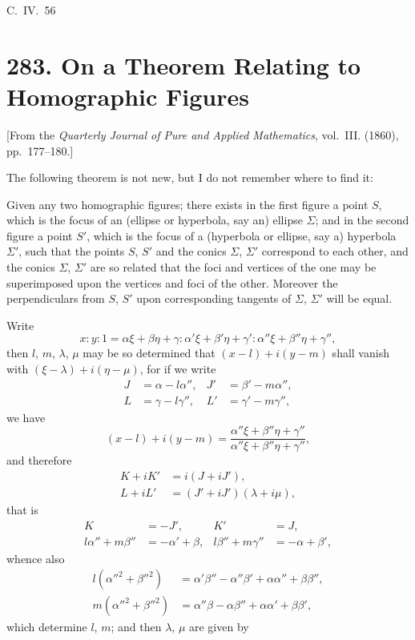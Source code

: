 \documentclass[11pt,a4paper]{article}
\theoremstyle{plain}
\begin{document}
\hfill C.~IV.\ 56



\newpage
\section*{283. On a Theorem Relating to Homographic Figures}
\label{sec:283}

[From the \textit{Quarterly Journal of Pure and Applied Mathematics}, vol.~III. (1860), pp.~177--180.]

The following theorem is not new, but I do not remember where to find it:

Given any two homographic figures; there exists in the first figure a point $S$, which is the focus of an (ellipse or hyperbola, say an) ellipse $\Sigma$; and in the second figure a point $S'$, which is the focus of a (hyperbola or ellipse, say a) hyperbola $\Sigma'$, such that the points $S$, $S'$ and the conics $\Sigma$, $\Sigma'$ correspond to each other, and the conics $\Sigma$, $\Sigma'$ are so related that the foci and vertices of the one may be superimposed upon the vertices and foci of the other. Moreover the perpendiculars from $S$, $S'$ upon corresponding tangents of $\Sigma$, $\Sigma'$ will be equal.

Write
\[
x : y : 1 = \alpha\xi + \beta\eta + \gamma : \alpha'\xi + \beta'\eta + \gamma' : \alpha''\xi + \beta''\eta + \gamma'',
\]
then $l$, $m$, $\lambda$, $\mu$ may be so determined that $(x - l) + i(y - m)$ shall vanish with $(\xi - \lambda) + i(\eta - \mu)$, for if we write
\begin{align*}
J &= \alpha - l\alpha'', & J' &= \beta' - m\alpha'',\\
L &= \gamma - l\gamma'', & L' &= \gamma' - m\gamma'',
\end{align*}
we have
\[
(x - l) + i(y - m) = \frac{\alpha''\xi + \beta''\eta + \gamma''}{\alpha''\xi + \beta''\eta + \gamma''},
\]
and therefore
\begin{align*}
K + iK' &= i(J + iJ'),\\
L + iL' &= (J' + iJ')(\lambda + i\mu),
\end{align*}
that is
\begin{align*}
K &= -J', & K' &= J,\\
l\alpha'' + m\beta'' &= -\alpha' + \beta, & l\beta'' + m\gamma'' &= -\alpha + \beta',
\end{align*}
whence also
\begin{align*}
l(\alpha''^2 + \beta''^2) &= \alpha'\beta'' - \alpha''\beta' + \alpha\alpha'' + \beta\beta'',\\
m(\alpha''^2 + \beta''^2) &= \alpha''\beta - \alpha\beta'' + \alpha\alpha' + \beta\beta',
\end{align*}
which determine $l$, $m$; and then $\lambda$, $\mu$ are given by
\end{document}
